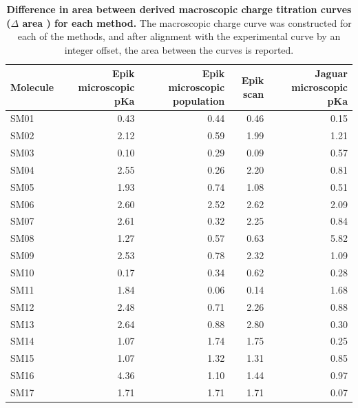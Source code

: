 \documentclass[9pt,lineno,final]{elife}
\begin{document}
\begin{table}[H]
	\centering
	\caption{{\bf Difference in area between derived macroscopic charge titration curves ($\Delta$ area ) for each method.} The macroscopic charge curve was constructed for each of the methods, and after alignment with the experimental curve by an integer offset, the area between the curves is reported.}
	\label{tab:titration-curves}
	\begin{tabular}{lrrrr}
		\toprule
		Molecule &  Epik microscopic pKa &  Epik microscopic population  &  Epik scan &   Jaguar microscopic pKa \\
		    
		\midrule
		SM01 &       0.43 &        0.44 &         0.46 &         0.15 \\
		SM02 &       2.12 &        0.59 &         1.99 &         1.21 \\
		SM03 &       0.10 &        0.29 &         0.09 &         0.57 \\
		SM04 &       2.55 &        0.26 &         2.20 &         0.81 \\
		SM05 &       1.93 &        0.74 &         1.08 &         0.51 \\
		SM06 &       2.60 &        2.52 &         2.62 &         2.09 \\
		SM07 &       2.61 &        0.32 &         2.25 &         0.84 \\
		SM08 &       1.27 &        0.57 &         0.63 &         5.82 \\
		SM09 &       2.53 &        0.78 &         2.32 &         1.09 \\
		SM10 &       0.17 &        0.34 &         0.62 &         0.28 \\
		SM11 &       1.84 &        0.06 &         0.14 &         1.68 \\
		SM12 &       2.48 &        0.71 &         2.26 &         0.88 \\
		SM13 &       2.64 &        0.88 &         2.80 &         0.30 \\
		SM14 &       1.07 &        1.74 &         1.75 &         0.25 \\
		SM15 &       1.07 &        1.32 &         1.31 &         0.85 \\
		SM16 &       4.36 &        1.10 &         1.44 &         0.97 \\
		SM17 &       1.71 &        1.71 &         1.71 &         0.07 \\

\end{tabular}
\end{table}
\end{document}
